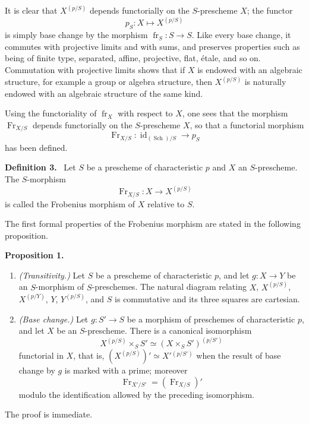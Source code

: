 \documentclass[11pt]{article}
\newenvironment{statement}[1]{\par\medskip\noindent\textbf{#1.}\ }{\par\medskip}
\providecommand{\id}{\operatorname{id}}
\providecommand{\id}{\operatorname{id}}
\providecommand{\id}{\operatorname{id}}
\providecommand{\id}{\operatorname{id}}
\providecommand{\id}{\operatorname{id}}
\providecommand{\fr}{\operatorname{fr}}
\providecommand{\Fr}{\operatorname{Fr}}
\providecommand{\Sch}{\operatorname{Sch}}
\begin{document}
It is clear that $X^{(p/S)}$ depends functorially on the $S$-prescheme $X$; the functor
\[
p_S:X\longmapsto X^{(p/S)}
\]
is simply base change by the morphism $\fr_S:S\to S$. Like every base change, it commutes with projective limits and with sums, and preserves properties such as being of finite type, separated, affine, projective, flat, étale, and so on. Commutation with projective limits shows that if $X$ is endowed with an algebraic structure, for example a group or algebra structure, then $X^{(p/S)}$ is naturally endowed with an algebraic structure of the same kind.

Using the functoriality of $\fr_X$ with respect to $X$, one sees that the morphism $\Fr_{X/S}$ depends functorially on the $S$-prescheme $X$, so that a functorial morphism
\[
\Fr_{X/S}:\id_{(\Sch)/S}\longrightarrow p_S
\]
has been defined.

\begin{statement}{Definition 3}
Let $S$ be a prescheme of characteristic $p$ and $X$ an $S$-prescheme. The $S$-morphism
\[
\Fr_{X/S}:X\longrightarrow X^{(p/S)}
\]
is called the Frobenius morphism of $X$ relative to $S$.
\end{statement}

The first formal properties of the Frobenius morphism are stated in the following proposition.

\begin{statement}{Proposition 1}
\begin{enumerate}[label=\alph*)]
\item \emph{(Transitivity.)} Let $S$ be a prescheme of characteristic $p$, and let $g:X\to Y$ be an $S$-morphism of $S$-preschemes. The natural diagram relating $X$, $X^{(p/S)}$, $X^{(p/Y)}$, $Y$, $Y^{(p/S)}$, and $S$ is commutative and its three squares are cartesian.

\item \emph{(Base change.)} Let $g:S'\to S$ be a morphism of preschemes of characteristic $p$, and let $X$ be an $S$-prescheme. There is a canonical isomorphism
\[
X^{(p/S)}\times_S S'\simeq (X\times_S S')^{(p/S')}
\]
functorial in $X$, that is, $(X^{(p/S)})'\simeq X'{}^{(p/S')}$ when the result of base change by $g$ is marked with a prime; moreover
\[
\Fr_{X'/S'}=(\Fr_{X/S})'
\]
modulo the identification allowed by the preceding isomorphism.
\end{enumerate}
\end{statement}

The proof is immediate.
\end{document}
